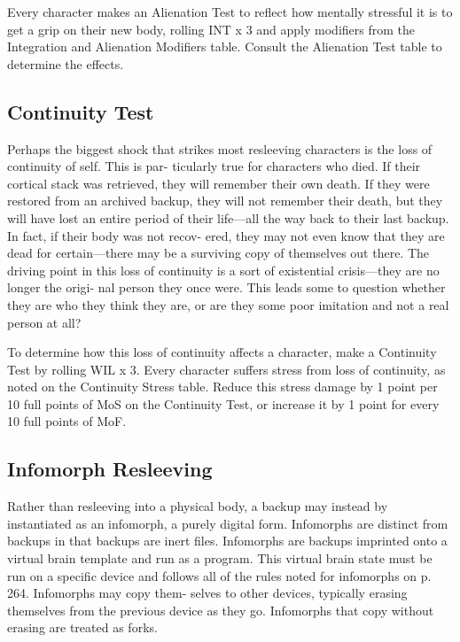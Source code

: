 Every character makes an Alienation Test to reflect 
how mentally stressful it is to get a grip on their new 
body, rolling INT x 3 and apply modifiers from the 
Integration and Alienation Modifiers table. Consult 
the Alienation Test table to determine the effects.

\subsection{Continuity Test}

Perhaps the biggest shock that strikes most resleeving 
characters is the loss of continuity of self. This is par-
ticularly true for characters who died. If their cortical 
stack was retrieved, they will remember their own 
death. If they were restored from an archived backup, 
they will not remember their death, but they will have 
lost an entire period of their life—all the way back to 
their last backup. In fact, if their body was not recov-
ered, they may not even know that they are dead for 
certain—there may be a surviving copy of themselves 
out there. The driving point in this loss of continuity is 
a sort of existential crisis—they are no longer the origi-
nal person they once were. This leads some to question 
whether they are who they think they are, or are they 
some poor imitation and not a real person at all?

To determine how this loss of continuity affects a 
character, make a Continuity Test by rolling WIL x 3. 
Every character suffers stress from loss of continuity, 
as noted on the Continuity Stress table. Reduce this 
stress damage by 1 point per 10 full points of MoS on 
the Continuity Test, or increase it by 1 point for every 
10 full points of MoF.

\subsection{Infomorph Resleeving}

Rather than resleeving into a physical body, a backup 
may instead by instantiated as an infomorph, a purely 
digital form. Infomorphs are distinct from backups in 
that backups are inert files. Infomorphs are backups 
imprinted onto a virtual brain template and run as 
a program. This virtual brain state must be run on a 
specific device and follows all of the rules noted for 
infomorphs on p. 264. Infomorphs may copy them-
selves to other devices, typically erasing themselves 
from the previous device as they go. Infomorphs that 
copy without erasing are treated as forks.

